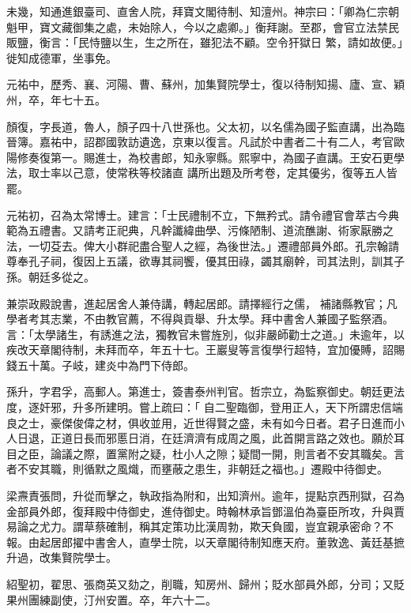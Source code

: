 \begin{pinyinscope}
 未幾，知通進銀臺司、直舍人院，拜寶文閣待制、知澶州。神宗曰：「卿為仁宗朝魁甲，寶文藏御集之處，未始除人，今以之處卿。」衡拜謝。至郡，會官立法禁民販鹽，衡言：「民恃鹽以生，生之所在，雖犯法不顧。空令犴獄日
 繁，請如故便。」徙知成德軍，坐事免。



 元祐中，歷秀、襄、河陽、曹、蘇州，加集賢院學士，復以待制知揚、廬、宣、穎州，卒，年七十五。



 顏復，字長道，魯人，顏子四十八世孫也。父太初，以名儒為國子監直講，出為臨晉簿。嘉祐中，詔郡國敦訪遺逸，京東以復言。凡試於中書者二十有二人，考官歐陽修奏復第一。賜進士，為校書郎，知永寧縣。熙寧中，為國子直講。王安石更學法，取士率以己意，使常秩等校諸直
 講所出題及所考卷，定其優劣，復等五人皆罷。



 元祐初，召為太常博士。建言：「士民禮制不立，下無矜式。請令禮官會萃古今典範為五禮書。又請考正祀典，凡幹讖緯曲學、污條陋制、道流醮謝、術家厭勝之法，一切芟去。俾大小群祀盡合聖人之經，為後世法。」遷禮部員外郎。孔宗翰請尊奉孔子祠，復因上五議，欲專其祠饗，優其田祿，蠲其廟幹，司其法則，訓其子孫。朝廷多從之。



 兼崇政殿說書，進起居舍人兼侍講，轉起居郎。請擇經行之儒，
 補諸縣教官；凡學者考其志業，不由教官薦，不得與貢舉、升太學。拜中書舍人兼國子監祭酒。言：「太學諸生，有誘進之法，獨教官未嘗旌別，似非嚴師勸士之道。」未逾年，以疾改天章閣待制，未拜而卒，年五十七。王巖叟等言復學行超特，宜加優賻，詔賜錢五十萬。子岐，建炎中為門下侍郎。



 孫升，字君孚，高郵人。第進士，簽書泰州判官。哲宗立，為監察御史。朝廷更法度，逐奸邪，升多所建明。嘗上疏曰：「
 自二聖臨御，登用正人，天下所謂忠信端良之士，豪傑俊偉之材，俱收並用，近世得賢之盛，未有如今日者。君子日進而小人日退，正道日長而邪慝日消，在廷濟濟有成周之風，此首開言路之效也。願於耳目之臣，論議之際，置黨附之疑，杜小人之隙；疑間一開，則言者不安其職矣。言者不安其職，則循默之風熾，而壅蔽之患生，非朝廷之福也。」遷殿中待御史。



 梁燾責張問，升從而擊之，執政指為附和，出知濟州。逾年，提點京西刑獄，召為
 金部員外郎，復拜殿中侍御史，進侍御史。時翰林承旨鄧溫伯為臺臣所攻，升與賈易論之尤力。謂草蔡確制，稱其定策功比漢周勃，欺天負國，豈宜親承密命？不報。由起居郎擢中書舍人，直學士院，以天章閣待制知應天府。董敦逸、黃廷基摭升過，改集賢院學士。



 紹聖初，翟思、張商英又劾之，削職，知房州、歸州；貶水部員外郎，分司；又貶果州團練副使，汀州安置。卒，年六十二。




\end{pinyinscope}
